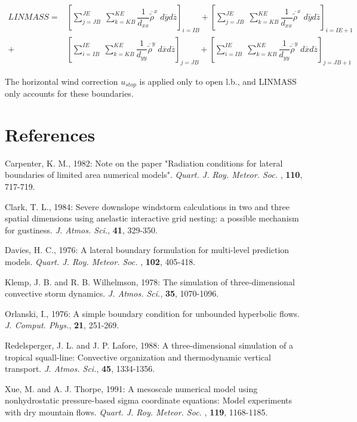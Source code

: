 \begin{eqnarray}
LINMASS  = &
 \left[{ \sum_{j=JB}^{JE} \; \sum_{k=KB}^{KE}
 \dfrac{1}{d_{xx} } \overline{  {\tilde{\rho} } }^{x} \;
d{\overline{y}} d{\overline{z}} }\right]_{i=IB}
+\left[{ \sum_{j=JB}^{JE} \; \sum_{k=KB}^{KE}
 \dfrac{1}{d_{xx} } \overline{  {\tilde{\rho} } }^{x} \;
d{\overline{y}} d{\overline{z}} }\right]_{i=IE+1}
\nonumber \\
+&\left[{ \sum_{i=IB}^{IE} \; \sum_{k=KB}^{KE}
 \dfrac{1}{d_{yy} } \overline{  {\tilde{\rho} } }^{y} \;
d{\overline{x}} d{\overline{z}} }\right]_{j=JB}
+\left[{ \sum_{i=IB}^{IE} \; \sum_{k=KB}^{KE}
 \dfrac{1}{d_{yy} } \overline{  {\tilde{\rho} } }^{y} \;
d{\overline{x}} d{\overline{z}} }\right]_{j=JB+1}
\end{eqnarray}

 The horizontal wind correction $u_{stop}$ is
applied only to open l.b., and LINMASS only accounts for these boundaries.


\section*{References}
\parindent 0cm

\por
Carpenter, K. M., 1982: Note on the paper "Radiation conditions for lateral
boundaries of limited area numerical models".
{\it Quart. J. Roy. Meteor. Soc. }, {\bf 110}, 717-719.

\por
Clark, T. L., 1984: Severe downslope windstorm calculations in two and three
spatial dimensions using anelastic interactive grid nesting: a possible
mechanism for gustiness. {\it J. Atmos. Sci.},  {\bf 41}, 329-350.

\por
Davies, H. C., 1976: A lateral boundary formulation for multi-level prediction
models.
{\it Quart. J. Roy. Meteor. Soc. }, {\bf 102}, 405-418.

\por
Klemp, J. B. and R. B. Wilhelmson, 1978: The simulation of three-dimensional
convective storm dynamics. {\it J. Atmos. Sci.},  {\bf 35}, 1070-1096.

\por
Orlanski, I., 1976: A simple boundary condition for unbounded hyperbolic flows.
{\it J. Comput. Phys.}, {\bf 21}, 251-269.

\por
Redelsperger, J. L. and J. P. Lafore, 1988: A three-dimensional simulation of a
tropical squall-line: Convective organization and thermodynamic vertical
transport. {\it J. Atmos. Sci.},  {\bf 45}, 1334-1356.

\por
Xue, M. and A. J. Thorpe, 1991: A mesoscale numerical model using nonhydrostatic
pressure-based sigma coordinate equations: Model experiments with dry mountain
flows.
{\it Quart. J. Roy. Meteor. Soc. }, {\bf 119}, 1168-1185.

